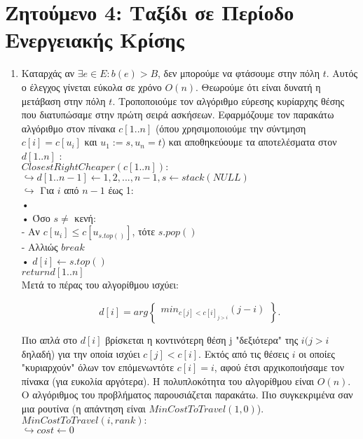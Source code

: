 \documentclass[11pt]{article}
\begin{document}
\section*{Ζητούμενο 4: Ταξίδι σε Περίοδο Ενεργειακής Κρίσης}

\begin{enumerate}
    \item Καταρχάς αν $\exists e \in E : b(e) > B$, δεν μπορούμε να φτάσουμε στην πόλη $t$. Αυτός ο έλεγχος γίνεται εύκολα σε χρόνο $O(n)$. Θεωρούμε ότι είναι δυνατή η μετάβαση στην πόλη $t$. Τροποποιούμε τον αλγόριθμο εύρεσης κυρίαρχης θέσης που διατυπώσαμε στην πρώτη
    σειρά ασκήσεων. Εφαρμόζουμε τον παρακάτω αλγόριθμο στον πίνακα $c[1..n]$ (όπου χρησιμοποιούμε την σύντμηση $c[i] = c[u_i]$ και $u_1:= s, u_n =t$) και αποθηκεύουμε τα αποτελέσματα στον $d[1..n]$ :\\
    $ClosestRightCheaper( c[1..n] ):$\\
    $ \hookrightarrow d[1..n- 1] \leftarrow 1, 2, ..., n- 1, s \leftarrow stack(NULL)$\\
    $\hookrightarrow$ Για $i$ από $n - 1$ έως 1:\\
    •  \\
    • Όσο $s\neq $ κενή:\\
    - Αν $c[u_i] \leq c[u_{s.top()}]$, τότε $s.pop()$\\
    - Αλλιώς $break$\\
    • $d[i] \leftarrow s.top()$\\ $return d[1..n]$ \\
    Μετά το πέρας του αλγορίθμου ισχύει:
    \begin{center}
      \[ d[i]=arg
      \left\{
      \begin{array}{ll}
        min_{c[j]<c[i]_{j>i}}(j-i) 
      \end{array} 
      \right\}. 
      \]
    \end{center}
    Πιο απλά στο $d[i]$ βρίσκεται η κοντινότερη θέση j "δεξιότερα" της $i (j > i$ δηλαδή) για την
    οποία ισχύει $c[j] < c[i]$. Εκτός από τις θέσεις $i$ οι οποίες "κυριαρχούν" όλων τον επόμενωντότε $c[i]=i$, αφού έτσι αρχικοποιήσαμε τον πίνακα (για ευκολία αργότερα). Η πολυπλοκότητα του αλγορίθμου είναι $O(n)$. Ο αλγόριθμος του προβλήματος παρουσιάζεται παρακάτω. Πιο συγκεκριμένα σαν μια ρουτίνα (η απάντηση είναι $MinCostToTravel(1,0)$).\\
    $MinCostToTravel(i,rank):$\\
    $\hookrightarrow cost \leftarrow 0$ \\

\end{enumerate}
\end{document}
